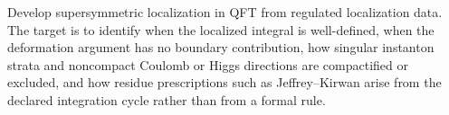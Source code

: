 \begin{openproblem}
\label{op:rigorous-supersymmetric-localization}
Develop supersymmetric localization in QFT from regulated localization data.
The target is to identify when the localized integral is well-defined, when
the deformation argument has no boundary contribution, how singular instanton
strata and noncompact Coulomb or Higgs directions are compactified or
excluded, and how residue prescriptions such as Jeffrey--Kirwan arise from
the declared integration cycle rather than from a formal rule.
\end{openproblem}
